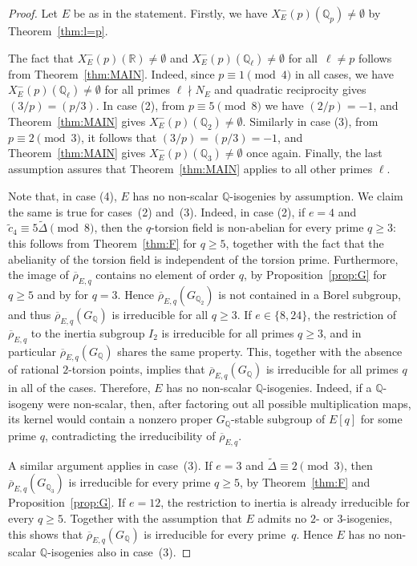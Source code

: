 \documentclass[12pt]{amsart}
\numberwithin{equation}{section}
\theoremstyle{definition}
\newcommand{\Q}{\mathbb{Q}}
\newcommand{\R}{\mathbb{R}}
\newcommand{\rhobar}{{\overline{\rho}}}
\newcommand{\Xp}{X_E^{-}(p)}
\begin{document}
\begin{proof}
Let $E$ be as in the statement. Firstly, we have $\Xp(\Q_p) \neq \emptyset$
by Theorem~\ref{thm:l=p}.

The fact that $X_{E}^-(p)(\R) \neq \emptyset$ and $\Xp(\Q_\ell) \neq \emptyset$ for all~$\ell\neq p$ follows from Theorem~\ref{thm:MAIN}. Indeed, since $p \equiv 1 \pmod{4}$ in all cases, we have $X_{E}^-(p)(\Q_\ell) \neq \emptyset$ for all primes $\ell \nmid N_E$ and quadratic reciprocity gives $(3/p) = (p/3)$.
In case (2), from $p \equiv 5 \pmod{8}$ we have $(2/p) = -1$, and  Theorem~\ref{thm:MAIN} gives $X_{E}^-(p)(\Q_2) \neq \emptyset$. Similarly in case (3), from $p \equiv 2 \pmod{3}$, it follows that $(3/p) = (p/3)=-1$, and Theorem~\ref{thm:MAIN} gives $X_{E}^-(p)(\Q_3) \neq \emptyset$ once again. Finally, the last assumption assures that Theorem~\ref{thm:MAIN} applies to all other primes $\ell$.

Note that, in case (4), $E$ has no non-scalar $\Q$-isogenies by assumption. We claim the same is true for cases~(2) and~(3). 
Indeed, in case (2),
if \(e=4\) and
\(\tilde{c}_4\equiv5\tilde{\Delta}\pmod 8\), then the
\(q\)-torsion field is non-abelian for every prime \(q\geq3\):
this follows from Theorem~\ref{thm:F} for \(q\geq5\), together with
the fact that the abelianity of the torsion field is independent of
the torsion prime. Furthermore, the image of \(\rhobar_{E,q}\)
contains no element of order \(q\), by
Proposition~\ref{prop:G} for \(q\geq5\) and by
\cite[Proposition~9]{symplectic} for \(q=3\).
Hence $\rhobar_{E,q}(G_{\Q_2})$ is not contained in a Borel subgroup, and thus 
$\rhobar_{E,q}(G_\Q)$ is irreducible for all $q\geq3$. 
If $e\in \{8,24\}$, the restriction of $\rhobar_{E,q}$ to the inertia subgroup $I_2$ is irreducible for all primes $q\geq 3$, and in particular $\rhobar_{E,q}(G_\Q)$ shares the same property. This, together with the absence of rational $2$-torsion points, implies that $\rhobar_{E,q}(G_\Q)$ is irreducible for all primes $q$ in all of the cases. Therefore, $E$ has no non-scalar $\Q$-isogenies. Indeed, if a \(\Q\)-isogeny were non-scalar, then, after factoring
out all possible multiplication maps, its kernel would contain a
nonzero proper \(G_\Q\)-stable subgroup of \(E[q]\) for some prime
\(q\), contradicting the irreducibility of \(\rhobar_{E,q}\).
 
A similar argument applies in case~\textup{(3)}. If \(e=3\) and
\(\tilde{\Delta}\equiv2\pmod3\), then
\(\rhobar_{E,q}(G_{\Q_3})\) is irreducible for every prime
\(q\geq5\), by Theorem~\ref{thm:F} and
Proposition~\ref{prop:G}. If \(e=12\), the restriction to inertia is
already irreducible for every \(q\geq5\). Together with the
assumption that \(E\) admits no \(2\)- or \(3\)-isogenies, this shows
that \(\rhobar_{E,q}(G_\Q)\) is irreducible for every prime~\(q\).
Hence \(E\) has no non-scalar \(\Q\)-isogenies also in
case~\textup{(3)}.



\end{proof}
\end{document}
